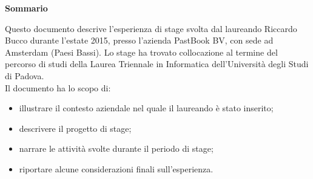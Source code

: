\begin{center}
	\textbf{Sommario}
\end{center}
Questo documento descrive l'esperienza di stage svolta dal laureando Riccardo Bucco durante l'estate 2015, presso l'azienda PastBook BV, con
sede ad Amsterdam (Paesi Bassi). Lo stage ha trovato collocazione al termine del percorso di studi della Laurea Triennale in Informatica
dell'Università degli Studi di Padova.\\
Il documento ha lo scopo di:
\begin{itemize}
	\item illustrare il contesto aziendale nel quale il laureando è stato inserito;
	\item descrivere il progetto di stage;
	\item narrare le attività svolte durante il periodo di stage;
	\item riportare alcune considerazioni finali sull'esperienza.
\end{itemize}
